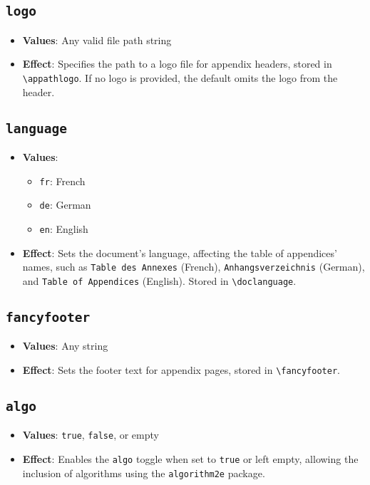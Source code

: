\documentclass[12pt,twoside]{report}
\begin{document}
\subsection{\texttt{logo}}
\begin{itemize}
    \item \textbf{Values}: Any valid file path string
    \item \textbf{Effect}: Specifies the path to a logo file for appendix headers, stored in \texttt{\textbackslash appathlogo}. If no logo is provided, the default omits the logo from the header.
\end{itemize}

\subsection{\texttt{language}}
\begin{itemize}
    \item \textbf{Values}:
    \begin{itemize}
        \item \texttt{fr}: French
        \item \texttt{de}: German
        \item \texttt{en}: English
    \end{itemize}
    \item \textbf{Effect}: Sets the document's language, affecting the table of appendices' names, such as \texttt{Table des Annexes} (French), \texttt{Anhangsverzeichnis} (German), and \texttt{Table of Appendices} (English). Stored in \texttt{\textbackslash doclanguage}.
\end{itemize}

\subsection{\texttt{fancyfooter}}
\begin{itemize}
    \item \textbf{Values}: Any string
    \item \textbf{Effect}: Sets the footer text for appendix pages, stored in \texttt{\textbackslash fancyfooter}.
\end{itemize}

\subsection{\texttt{algo}}
\begin{itemize}
    \item \textbf{Values}: \texttt{true}, \texttt{false}, or empty
    \item \textbf{Effect}: Enables the \texttt{algo} toggle when set to \texttt{true} or left empty, allowing the inclusion of algorithms using the \texttt{algorithm2e} package.
\end{itemize}
\end{document}
